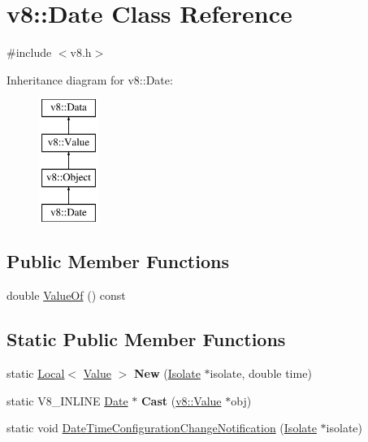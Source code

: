 \hypertarget{classv8_1_1Date}{}\section{v8\+:\+:Date Class Reference}
\label{classv8_1_1Date}


{\ttfamily \#include $<$v8.\+h$>$}

Inheritance diagram for v8\+:\+:Date\+:\begin{figure}[H]
\begin{center}
\leavevmode
\includegraphics[height=4.000000cm]{classv8_1_1Date}
\end{center}
\end{figure}
\subsection*{Public Member Functions}
\begin{DoxyCompactItemize}
\item 
double \hyperlink{classv8_1_1Date_a06800409271fe5fa74202e0fd1ec8e87}{Value\+Of} () const 
\end{DoxyCompactItemize}
\subsection*{Static Public Member Functions}
\begin{DoxyCompactItemize}
\item 
\hypertarget{classv8_1_1Date_a5f93eb196aa81f4564a8903aeb88cabb}{}static \hyperlink{classv8_1_1Local}{Local}$<$ \hyperlink{classv8_1_1Value}{Value} $>$ {\bfseries New} (\hyperlink{classv8_1_1Isolate}{Isolate} $\ast$isolate, double time)\label{classv8_1_1Date_a5f93eb196aa81f4564a8903aeb88cabb}

\item 
\hypertarget{classv8_1_1Date_a8e5ea7c1f28924b82922270d6596b4d3}{}static V8\+\_\+\+I\+N\+L\+I\+N\+E \hyperlink{classv8_1_1Date}{Date} $\ast$ {\bfseries Cast} (\hyperlink{classv8_1_1Value}{v8\+::\+Value} $\ast$obj)\label{classv8_1_1Date_a8e5ea7c1f28924b82922270d6596b4d3}

\item 
static void \hyperlink{classv8_1_1Date_adb084ec0683d3d195ad0f78af5f6f72b}{Date\+Time\+Configuration\+Change\+Notification} (\hyperlink{classv8_1_1Isolate}{Isolate} $\ast$isolate)
\end{DoxyCompactItemize}


